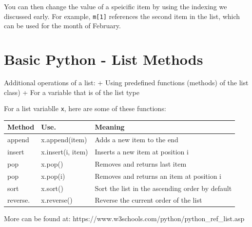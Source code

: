 \documentclass[
  letterpaper,
]{scrbook}
\newcounter{none} %
\begin{document}
You can then change the value of a speicific item by using the indexing
we discussed early. For example, \texttt{m{[}1{]}} references the second
item in the list, which can be used for the month of February.

\section*{Basic Python - List
Methods}\label{basic-python---list-methods}


Additional operations of a list: + Using predefined functions (methods)
of the list class) + For a variable that is of the list type

For a list variablle \texttt{x}, here are some of these functions:

{\def\LTcaptype{none} %
\begin{longtable}[]{@{}
  >{\raggedright\arraybackslash}p{}
  >{\raggedright\arraybackslash}p{}
  >{\raggedright\arraybackslash}p{}@{}}
\toprule\noalign{}
\begin{minipage}[b]{\linewidth}\raggedright
Method
\end{minipage} & \begin{minipage}[b]{\linewidth}\raggedright
Use.
\end{minipage} & \begin{minipage}[b]{\linewidth}\raggedright
Meaning
\end{minipage} \\
\midrule\noalign{}
\endhead
\bottomrule\noalign{}
\endlastfoot
append & x.append(item) & Adds a new item to the end \\
insert & x.insert(i, item) & Inserts a new item at position i \\
pop & x.pop() & Removes and returns last item \\
pop & x.pop(i) & Removes and returns an item at position i \\
sort & x.sort() & Sort the list in the ascending order by default \\
reverse. & x.reverse() & Reverse the current order of the list \\
\end{longtable}
}

More can be found at:
https://www.w3schools.com/python/python\_ref\_list.asp
\end{document}

